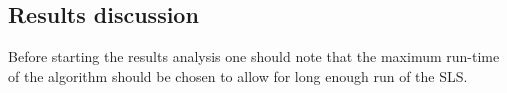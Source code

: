 





\subsection{Results discussion}
Before starting the results analysis one should note that the maximum run-time of the algorithm should be chosen to allow for long enough run of the SLS.
  
